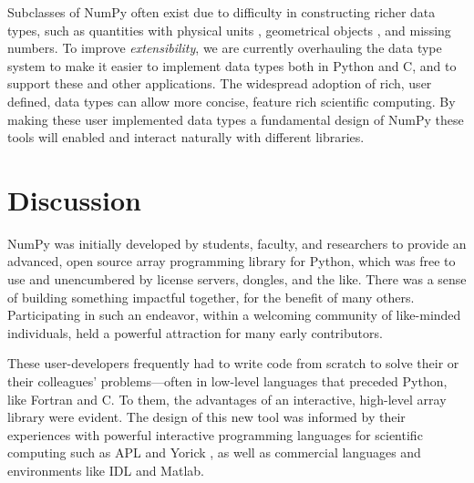 
Subclasses of NumPy often exist due to difficulty in constructing richer data
types, such as quantities with physical units \cite{astropy,Goldbaum2018,pint},
geometrical objects \cite{pygeos}, and missing numbers. %
To improve \emph{extensibility}, we are currently overhauling the data type
system to make it easier to implement data types both in Python and C, and to
support these and other applications.
The widespread adoption of rich, user defined, data types can allow more
concise, feature rich scientific computing.
By making these user implemented data types a fundamental design of NumPy
these tools will enabled and interact naturally with different libraries.
%

\section*{Discussion}

NumPy was initially developed by students, faculty, and researchers to
provide an advanced, open source array programming library for Python,
which was free to use and unencumbered by license servers, dongles, and the like.
There was a sense of building something
impactful together, for the benefit of many others.  Participating in
such an endeavor, within a welcoming community of like-minded
individuals, held a powerful attraction for many early contributors.

These user-developers frequently had to write code from scratch to solve
their or their colleagues' problems---often in low-level languages
that preceded Python, like Fortran \cite{dongarra2008netlib} and C.
To them, the advantages of an interactive, high-level array library
were evident. The design of this new tool was informed by their
experiences with powerful interactive programming languages for
scientific computing such as APL \cite{iverson1962programming} and
Yorick \cite{munro1995using}, as well as commercial languages and
environments like IDL and Matlab.


